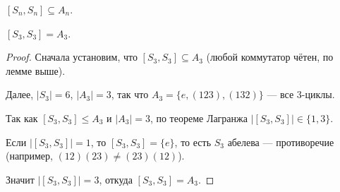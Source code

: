\begin{cor}
    $[S_n, S_n] \subseteq A_n$.
\end{cor}

\begin{stmt}
    $[S_3, S_3] = A_3$.
    \begin{proof}
        Сначала установим, что $[S_3, S_3] \subseteq A_3$ (любой коммутатор чётен, по лемме выше).

        Далее, $|S_3| = 6$, $|A_3| = 3$, так что $A_3 = \{e, (123), (132)\}$ --- все 3-циклы.

        Так как $[S_3, S_3] \leq A_3$ и $|A_3| = 3$, по теореме Лагранжа $|[S_3, S_3]| \in \{1, 3\}$.

        Если $|[S_3, S_3]| = 1$, то $[S_3, S_3] = \{e\}$, то есть $S_3$ абелева --- противоречие (например,
        $(12)(23) \neq (23)(12)$).

        Значит $|[S_3, S_3]| = 3$, откуда $[S_3, S_3] = A_3$.
    \end{proof}
\end{stmt}


